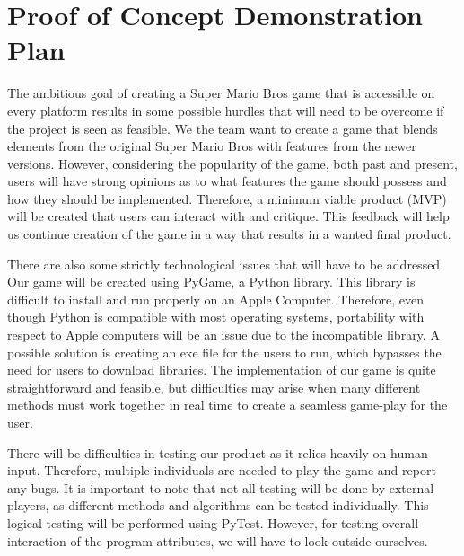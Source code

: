 \documentclass{article}
\begin{document}
\section{Proof of Concept Demonstration Plan}
%
%
%


The ambitious goal of creating a Super Mario Bros game that is accessible on
every platform results in some possible hurdles that will need to be overcome if
the project is seen as feasible. We the team want to create a game that blends
elements from the original Super Mario Bros with features from the newer
versions. However, considering the popularity of the game, both past and
present, users will have strong opinions as to what features the game should
possess and how they should be implemented. Therefore, a minimum viable product
(MVP) will be created that users can interact with and critique. This feedback
will help us continue creation of the game in a way that results in a wanted
final product.

There are also some strictly technological issues that will have to be
addressed. Our game will be created using PyGame, a Python library. This library
is difficult to install and run properly on an Apple Computer. Therefore, even
though Python is compatible with most operating systems, portability with
respect to Apple computers will be an issue due to the incompatible library. A
possible solution is creating an exe file for the users to run, which bypasses
the need for users to download libraries. The implementation of our game is
quite straightforward and feasible, but difficulties may arise when many
different methods must work together in real time to create a seamless game-play
for the user.

There will be difficulties in testing our product as it relies heavily on human
input. Therefore, multiple individuals are needed to play the game and report
any bugs. It is important to note that not all testing will be done by external
players, as different methods and algorithms can be tested individually. This
logical testing will be performed using PyTest. However, for testing overall
interaction of the program attributes, we will have to look outside ourselves.
\end{document}
